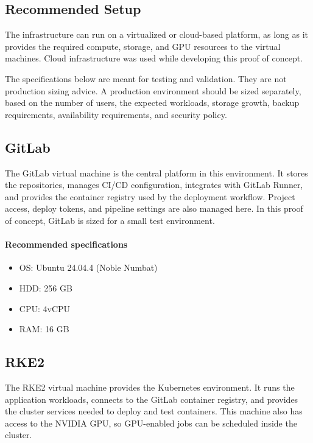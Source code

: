 \documentclass{article}
\begin{document}
\subsection{Recommended Setup}

The infrastructure can run on a virtualized or cloud-based platform, as long as it provides the required compute, storage, and GPU resources to the virtual machines. Cloud infrastructure was used while developing this proof of concept.

\vspace{0.5cm}

The specifications below are meant for testing and validation. They are not production sizing advice. A production environment should be sized separately, based on the number of users, the expected workloads, storage growth, backup requirements, availability requirements, and security policy.

\subsection{GitLab}

The GitLab virtual machine is the central platform in this environment. It stores the repositories, manages CI/CD configuration, integrates with GitLab Runner, and provides the container registry used by the deployment workflow. Project access, deploy tokens, and pipeline settings are also managed here. In this proof of concept, GitLab is sized for a small test environment.

\paragraph{Recommended specifications}
\begin{itemize}
	\item OS: Ubuntu 24.04.4 (Noble Numbat)
	\item HDD: 256 GB
	\item CPU: 4vCPU
	\item RAM: 16 GB
\end{itemize}

\subsection{RKE2}

The RKE2 virtual machine provides the Kubernetes environment. It runs the application workloads, connects to the GitLab container registry, and provides the cluster services needed to deploy and test containers. This machine also has access to the NVIDIA GPU, so GPU-enabled jobs can be scheduled inside the cluster.
\end{document}

